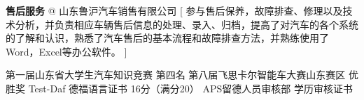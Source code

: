 \documentclass[zh]{resume}
\begin{document}
\begin{experiences}
	{\textbf{售后服务} @ 山东鲁沪汽车销售有限公司}%
	[ 参与售后保养，故障排查、修理以及技术分析，并负责相应车辆售后信息的处理、录入、归档，提高了对汽车的各个系统的了解和认识，熟悉了汽车售后的基本流程和故障排查方法，并熟练使用了Word，Excel等办公软件。
	]
\end{experiences}


\begin{competences}
	
\end{competences}

\begin{entries}
	{第一届山东省大学生汽车知识竞赛 \textbullet 第四名}
	{第八届飞思卡尔智能车大赛山东赛区 \textbullet 优胜奖}
	{Test-Daf 德福语言证书 \textbullet 16分（满分20）}
	{APS留德人员审核部 \textbullet 学历审核证书}
\end{entries}

\clearpage
\end{document}
